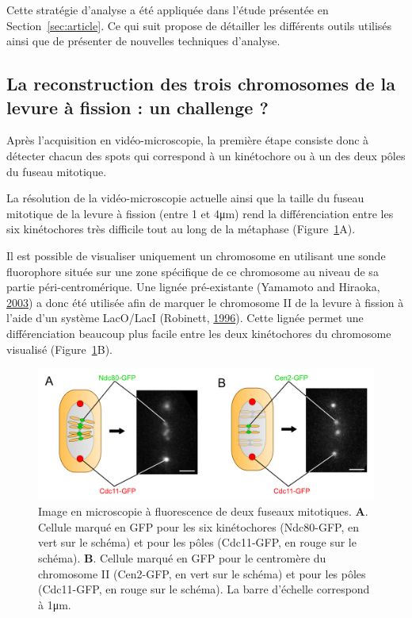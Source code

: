 \documentclass[12pt,a4paper,twoside,openright]{book}
\begin{document}
Cette stratégie d'analyse a été appliquée dans l'étude présentée en
Section~\ref{sec:article}. Ce qui suit propose de détailler les
différents outils utilisés ainsi que de présenter de nouvelles
techniques d'analyse.

\subsection{La reconstruction des trois chromosomes de la levure à
fission : un challenge
?}\label{la-reconstruction-des-trois-chromosomes-de-la-levure-uxe0-fission-un-challenge}

Après l'acquisition en vidéo-microscopie, la première étape consiste
donc à détecter chacun des spots qui correspond à un kinétochore ou à un
des deux pôles du fuseau mitotique.

La résolution de la vidéo-microscopie actuelle ainsi que la taille du
fuseau mitotique de la levure à fission (entre 1 et 4μm) rend la
différenciation entre les six kinétochores très difficile tout au long
de la métaphase (Figure~\ref{fig:spindle_peaks}A).

Il est possible de visualiser uniquement un chromosome en utilisant une
sonde fluorophore située sur une zone spécifique de ce chromosome au
niveau de sa partie péri-centromérique. Une lignée pré-existante
(Yamamoto and Hiraoka, \hyperref[ref-Yamamoto2003]{2003}) a donc été
utilisée afin de marquer le chromosome II de la levure à fission à
l'aide d'un système LacO/LacI (Robinett,
\hyperref[ref-Robinett1996]{1996}). Cette lignée permet une
différenciation beaucoup plus facile entre les deux kinétochores du
chromosome visualisé (Figure~\ref{fig:spindle_peaks}B).

\begin{figure}[htbp]
\centering
\includegraphics{figures/results/imaging/spindle_peaks.png}
\caption[Image en microscopie à fluorescence de deux fuseaux mitotique]{\label{fig:spindle_peaks}Image
en microscopie à fluorescence de deux fuseaux mitotiques. \textbf{A}.
Cellule marqué en GFP pour les six kinétochores (Ndc80-GFP, en vert sur
le schéma) et pour les pôles (Cdc11-GFP, en rouge sur le schéma).
\textbf{B}. Cellule marqué en GFP pour le centromère du chromosome II
(Cen2-GFP, en vert sur le schéma) et pour les pôles (Cdc11-GFP, en rouge
sur le schéma). La barre d'échelle correspond à 1μm.}
\end{figure}
\end{document}
